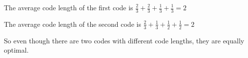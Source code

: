\begin{enumerate}
The average code length of the first code is $\frac{2}{3} + \frac{2}{3} + \frac{1}{3} + \frac{1}{3} = 2$

The average code length of the second code is $\frac{2}{3} + \frac{1}{3} + \frac{1}{2} + \frac{1}{2} = 2$

So even though there are two codes with different code lengths, they are equally optimal.













        
    \end{enumerate}

